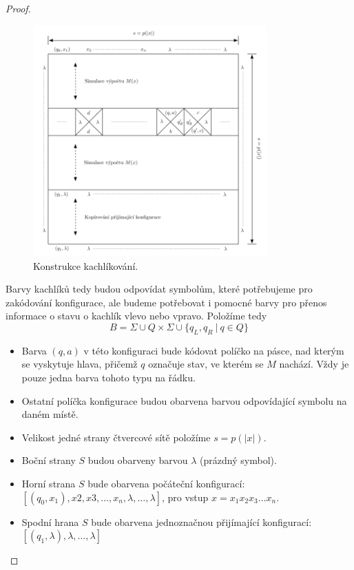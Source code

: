 \documentclass[11pt]{report} %
\numberwithin{equation}{section}
\begin{document}
\begin{proof}
\begin{figure}[H]
  \caption{Konstrukce kachlíkování.}
	\label{kachl_overview}
	\centering
	\includegraphics[width=0.8\textwidth]{img/kachl_overview.png}
\end{figure}

Barvy kachlíků tedy budou odpovídat symbolům, které potřebujeme pro zakódování konfigurace, ale budeme potřebovat i pomocné barvy pro přenos informace o stavu o kachlík vlevo nebo vpravo. Položíme tedy
$$ B = \Sigma \cup Q \times \Sigma \cup \{q_L, q_R\ |\ q \in Q\}$$

\begin{itemize}
	
	
	\item Barva $(q, a)$ v této konfiguraci bude kódovat políčko na pásce, nad kterým se vyskytuje hlava, přičemž $q$ označuje stav, ve kterém se $M$ nachází. Vždy je pouze jedna barva tohoto typu na řádku.
	\item Ostatní políčka konfigurace budou obarvena barvou odpovídající symbolu na daném místě.
	\item Velikost jedné strany čtvercové sítě položíme $s = p(|x|)$.
	\item Boční strany $S$ budou obarveny barvou $\lambda$ (prázdný symbol).
	\item Horní strana $S$ bude obarvena počáteční konfigurací: $[(q_0, x_1), x2, x3, \dots, x_n, \lambda, \dots,\lambda]$, pro vstup $x = x_1x_2x_3\dots x_n$.
	\item Spodní hrana $S$ bude obarvena jednoznačnou přijímající konfigurací: $[(q_1, \lambda), \lambda, \dots, \lambda]$
\end{itemize}


\end{proof}
\end{document}
